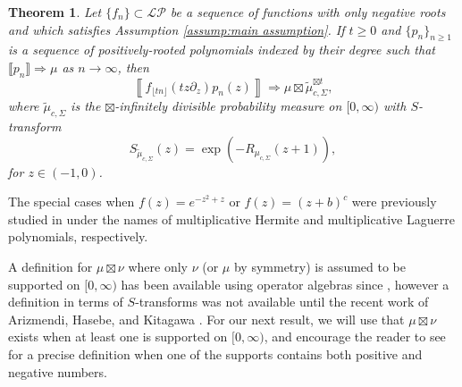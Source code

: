 \documentclass[reqno]{amsart}
\newcommand{\1}{\mathbf{1}}
\newcommand{\LP}{\mathcal{LP}}
\theoremstyle{plain}
\newtheorem{theorem}{Theorem}[section]
\theoremstyle{definition}
\theoremstyle{remark}
\numberwithin{equation}{section}
\begin{document}
\begin{theorem}\label{thm:Polya schur and multiplicative groups}
	Let $\{f_n\}\subset\LP$ be a sequence of functions with only negative roots and which satisfies  Assumption \ref{assump:main assumption}. If $t\geq 0$ and $\{p_n\}_{n\geq 1}$ is a sequence of positively-rooted polynomials indexed by their degree such that $\llbracket p_n\rrbracket\Rightarrow\mu$ as $n\rightarrow\infty$, then \begin{equation}
		\left\llbracket f_{\lfloor tn\rfloor}(tz\partial_{z})p_n(z)\right\rrbracket\Rightarrow \mu\boxtimes \tilde{\mu}_{c,\Sigma}^{\boxtimes t},
	\end{equation} where $\tilde{\mu}_{c,\Sigma}$ is the $\boxtimes$-infinitely divisible probability measure on $[0,\infty)$ with $S$-transform \begin{equation}
		S_{\tilde\mu_{c,\Sigma}}(z)=\exp\left(-R_{\mu_{c,\Sigma}}(z+1) \right),
	\end{equation} for $z\in (-1,0)$. 
\end{theorem}  

The special cases when $f(z)=e^{-z^2+z}$ or  $f(z)=(z+b)^{c}$ were previously studied in \cite{Jalowy-Kabluchko-Marynych2025part2,Kabluchko2026} under the names of multiplicative Hermite and multiplicative Laguerre polynomials, respectively. 

A definition for $\mu\boxtimes\nu$ where only $\nu$ (or $\mu$ by symmetry) is assumed to be supported on $[0,\infty)$ has been available using operator algebras since \cite{Voiculescu1987}, however a definition in terms of $S$-transforms was not available until the recent work of Arizmendi, Hasebe, and Kitagawa \cite{Arizmendi-Hasebe-Kitagawa2026}. For our next result, we will use that $\mu\boxtimes\nu$ exists when at least one is supported on $[0,\infty)$, and encourage the reader to see \cite{Arizmendi-Hasebe-Kitagawa2026} for a precise definition when one of the supports contains both positive and negative numbers. 
\end{document}
